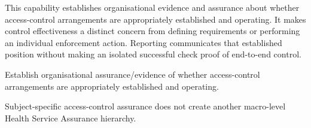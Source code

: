 This capability establishes organisational evidence and assurance about whether access-control arrangements are appropriately established and operating. It makes control effectiveness a distinct concern from defining requirements or performing an individual enforcement action. Reporting communicates that established position without making an isolated successful check proof of end-to-end control.



Establish organisational assurance/\allowbreak{}evidence of whether access-control arrangements are appropriately established and operating.



Subject-specific access-control assurance does not create another macro-level Health Service Assurance hierarchy.


